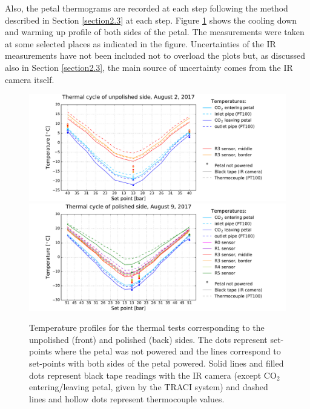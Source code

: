 		Also, the petal thermograms are recorded at each step following the method described in Section \ref{section2.3} at each step. Figure \ref{fig4.6} shows the cooling down and warming up profile of both sides of the petal. The measurements were taken at some selected places as indicated in the figure. Uncertainties of the IR measurements have not been included not to overload the plots but, as discussed also in Section \ref{section2.3}, the main source of uncertainty comes from the IR camera itself. 
		
		\begin{figure}[ht!]
			\centering
			\captionsetup{justification=centering,margin=0cm}
			\includegraphics[scale=0.45]{Figures/Chapter04/unwrapped_cycle_2_201711121522.pdf}
			\includegraphics[scale=0.45]{Figures/Chapter04/unwrapped_cycle_9_201711121522.pdf}
			\caption{Temperature profiles for the thermal tests corresponding to the unpolished (front) and polished (back) sides. The dots represent set-points where the petal was not powered and the lines correspond to set-points with both sides of the petal powered. Solid lines and filled dots represent black tape readings with the IR camera (except CO$_{2}$ entering/leaving petal, given by the TRACI system) and dashed lines and hollow dots represent thermocouple values.}\label{fig4.6}
		\end{figure}
		
